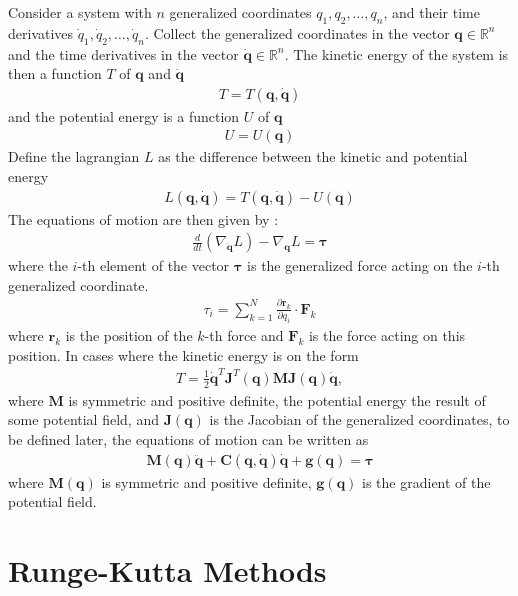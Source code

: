 Consider a system with $n$ generalized coordinates $q_1, q_2, \ldots, q_n$, and
their time derivatives $\dot{q}_1, \dot{q}_2, \ldots, \dot{q}_n$. Collect the
generalized coordinates in the vector $\bm{q} \in \mathbb{R}^n$ and the time
derivatives in the vector $\bm{\dot{q}} \in \mathbb{R}^n$. The kinetic energy
of the system is then a function $T$ of $\bm{q}$ and $\bm{\dot{q}}$
\begin{align}
    T = T(\bm{q}, \bm{\dot{q}})
\end{align}
and the potential energy is a function $U$ of $\bm{q}$
\begin{align}
    U = U(\bm{q})
\end{align}
Define the lagrangian $L$ as the difference between the kinetic and potential
energy
\begin{align}
    L(\bm{q}, \bm{\dot{q}}) = T(\bm{q}, \bm{\dot{q}}) - U(\bm{q})
\end{align}
The equations of motion are then given by \cite{modsim}:
\begin{align}
    \frac{d}{dt} \left( \nabla_{\dot{\bm{q}}} L \right) - \nabla_{\bm{q}} L = \bm{\tau}
\end{align}
where the $i$-th element of the vector $\bm{\tau}$ is the generalized force acting
on the $i$-th generalized coordinate.
\begin{align}
    \tau_i = \sum_{k=1}^N \frac{\partial \bm{r}_k}{\partial q_i} \cdot \bm{F}_k
\end{align}
where $\bm{r}_k$ is the position of the $k$-th force and $\bm{F}_k$ is the force
acting on this position. In cases where the kinetic energy is on the form
\begin{align}
    T = \frac{1}{2} \bm{\dot{q}}^T \bm{J}^T(\bm{q}) \bm{M} \bm{J}(\bm{q}) \bm{\dot{q}},
\end{align}
where $\bm{M}$ is symmetric and positive definite, the potential energy the
result of some potential field, and $\bm{J}(\bm{q})$ is the Jacobian of the
generalized coordinates, to be defined later, the equations of motion can be
written as
\begin{align}
    \bm{M}(\bm{q}) \ddot{\bm{q}} + \bm{C}(\bm{q}, \dot{\bm{q}}) \dot{\bm{q}} + \bm{g}(\bm{q}) = \bm{\tau}
\end{align}
where $\bm{M}(\bm{q})$ is symmetric and positive definite, $\bm{g}(\bm{q})$ is the
gradient of the potential field.

\section{Runge-Kutta Methods}

